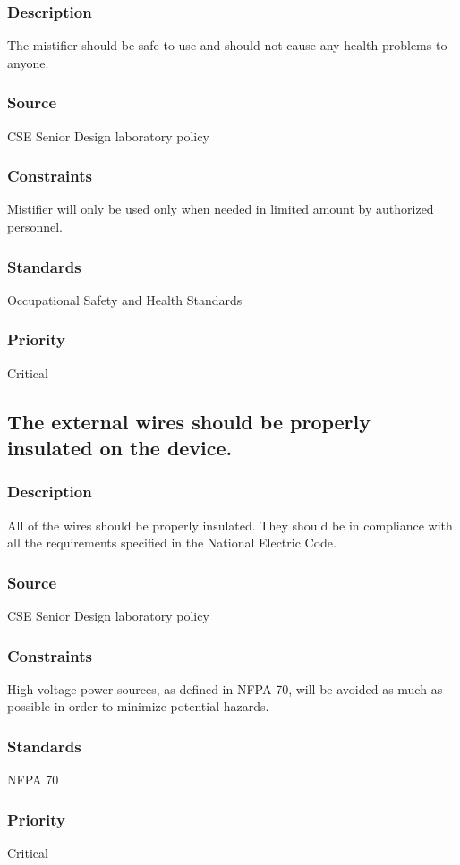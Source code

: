 \subsubsection{Description}
The mistifier should be safe to use and should not cause any health problems to anyone.
\subsubsection{Source}
CSE Senior Design laboratory policy
\subsubsection{Constraints}
Mistifier will only be used only when needed in limited amount by authorized personnel.
\subsubsection{Standards}
Occupational Safety and Health Standards
\subsubsection{Priority}
Critical

\subsection{The external wires should be properly insulated on the device.}
\subsubsection{Description}
All of the wires should be properly insulated. They should be in compliance with all the requirements specified in the National Electric Code.
\subsubsection{Source}
CSE Senior Design laboratory policy
\subsubsection{Constraints}
High voltage power sources, as defined in NFPA 70, will be avoided as much as possible in order to minimize potential hazards.
\subsubsection{Standards}
NFPA 70
\subsubsection{Priority}
Critical

